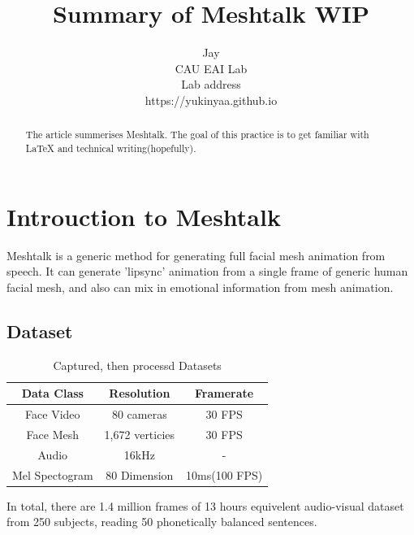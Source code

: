 \documentclass[10pt,twocolumn,letterpaper]{article}
\begin{document}
  \title{Summary of Meshtalk WIP}

  \author{Jay\\
    CAU EAI Lab\\
    Lab address\\
    {https://yukinyaa.github.io}
  }
  \maketitle
  \thispagestyle{empty}

  \begin{abstract}
    The article summerises Meshtalk\cite{richard2021meshtalk}.
    The goal of this practice is to get familiar with \LaTeX{} and technical writing(hopefully).
  \end{abstract}


  \section{Introuction to Meshtalk}
    Meshtalk is a generic method for generating full facial mesh animation from speech. It can generate 'lipsync' animation from a single frame of generic human facial mesh, and also can mix in emotional information from mesh animation.

      
    \subsection{Dataset}
      \begin{table}
        \begin{center}
          \begin{tabular}{|c||c c|}
              \hline
                Data Class & Resolution & Framerate \\
              \hline\hline
                Face Video & 80 cameras & 30 FPS \\
                Face Mesh & 1,672 verticies & 30 FPS \\
              \hline
                Audio & 16kHz & - \\
                Mel Spectogram & 80 Dimension & 10ms(100 FPS) \\
              \hline
          \end{tabular}
        \end{center}
        \caption{Captured, then processd Datasets}
        \label{table:dataset}
      \end{table}
      In total, there are 1.4 million frames of  13 hours equivelent audio-visual dataset from 250 subjects, reading 50 phonetically balanced sentences.
\end{document}
